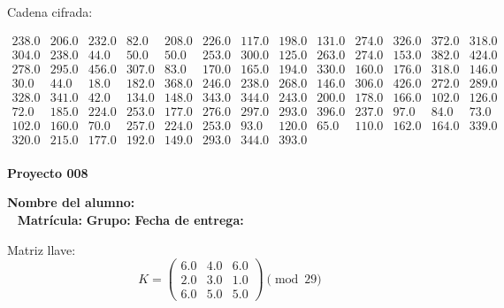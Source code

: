 \documentclass[12pt]{article}
\begin{document}
Cadena cifrada:
\begin{center}
$\begin{array}{lllllllllllll}
238.0 & 206.0 & 232.0 & 82.0 & 208.0 & 226.0 & 117.0 & 198.0 & 131.0 & 274.0 & 326.0 & 372.0 & 318.0\\
304.0 & 238.0 & 44.0 & 50.0 & 50.0 & 253.0 & 300.0 & 125.0 & 263.0 & 274.0 & 153.0 & 382.0 & 424.0\\
278.0 & 295.0 & 456.0 & 307.0 & 83.0 & 170.0 & 165.0 & 194.0 & 330.0 & 160.0 & 176.0 & 318.0 & 146.0\\
30.0 & 44.0 & 18.0 & 182.0 & 368.0 & 246.0 & 238.0 & 268.0 & 146.0 & 306.0 & 426.0 & 272.0 & 289.0\\
328.0 & 341.0 & 42.0 & 134.0 & 148.0 & 343.0 & 344.0 & 243.0 & 200.0 & 178.0 & 166.0 & 102.0 & 126.0\\
72.0 & 185.0 & 224.0 & 253.0 & 177.0 & 276.0 & 297.0 & 293.0 & 396.0 & 237.0 & 97.0 & 84.0 & 73.0\\
102.0 & 160.0 & 70.0 & 257.0 & 224.0 & 253.0 & 93.0 & 120.0 & 65.0 & 110.0 & 162.0 & 164.0 & 339.0\\
320.0 & 215.0 & 177.0 & 192.0 & 149.0 & 293.0 & 344.0 & 393.0\\
\end{array}$
\end{center}

\newpage


\textbf{Proyecto 008}

\textbf{Nombre del alumno:} \underline{\hspace{13cm}}\\\
\vspace{1cm}
\textbf{Matrícula:} \underline{\hspace{4cm}} \hspace{1cm}
\textbf{Grupo:} \underline{\hspace{2cm}}
\textbf{Fecha de entrega:} \underline{\hspace{2cm}}

\medskip

Matriz llave:
\[
K = \begin{pmatrix}
6.0 & 4.0 & 6.0\\
2.0 & 3.0 & 1.0\\
6.0 & 5.0 & 5.0
\end{pmatrix} \pmod{29}
\]
\end{document}
